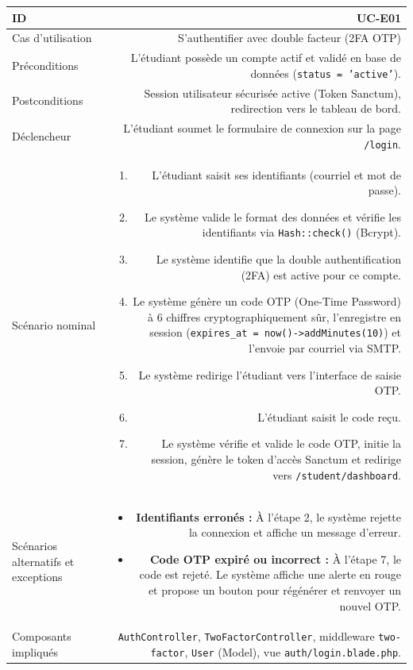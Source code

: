 \noindent
{}
\begin{tabularx}{\linewidth}{|L|R|}
\hline
{}ID & UC-E01 \\
\hline
Cas d'utilisation & S'authentifier avec double facteur (2FA OTP) \\
\hline
{}Préconditions & L'étudiant possède un compte actif et validé en base de données (\texttt{status = 'active'}). \\
\hline
Postconditions & Session utilisateur sécurisée active (Token Sanctum), redirection vers le tableau de bord. \\
\hline
{}Déclencheur & L'étudiant soumet le formulaire de connexion sur la page \texttt{/login}. \\
\hline
Scénario nominal &
\begin{enumerate}[nosep,leftmargin=*]
  \item L'étudiant saisit ses identifiants (courriel et mot de passe).
  \item Le système valide le format des données et vérifie les identifiants via \texttt{Hash::check()} (Bcrypt).
  \item Le système identifie que la double authentification (2FA) est active pour ce compte.
  \item Le système génère un code OTP (One-Time Password) à 6 chiffres cryptographiquement sûr, l'enregistre en session (\texttt{expires\_at = now()->addMinutes(10)}) et l'envoie par courriel via SMTP.
  \item Le système redirige l'étudiant vers l'interface de saisie OTP.
  \item L'étudiant saisit le code reçu.
  \item Le système vérifie et valide le code OTP, initie la session, génère le token d'accès Sanctum et redirige vers \texttt{/student/dashboard}.
\end{enumerate} \\
\hline
{}Scénarios alternatifs et exceptions &
\begin{itemize}[nosep,leftmargin=*]
  \item \textbf{Identifiants erronés :} À l'étape 2, le système rejette la connexion et affiche un message d'erreur.
  \item \textbf{Code OTP expiré ou incorrect :} À l'étape 7, le code est rejeté. Le système affiche une alerte en rouge et propose un bouton pour régénérer et renvoyer un nouvel OTP.
\end{itemize} \\
\hline
Composants impliqués & \texttt{AuthController}, \texttt{TwoFactorController}, middleware \texttt{two-factor}, \texttt{User} (Model), vue \texttt{auth/login.blade.php}. \\
\hline
\end{tabularx}

